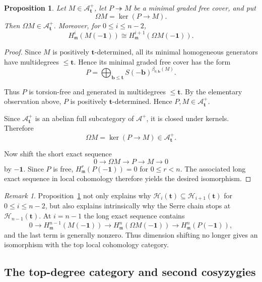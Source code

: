 \documentclass[12pt,reqno]{amsart}
\newtheorem{proposition}[theorem]{Proposition}
\theoremstyle{definition}
\theoremstyle{remark}
\newtheorem{remark}[theorem]{Remark}
\begin{document}
\begin{proposition}\label{prop:syzygy-filtration}
Let $M\in\mathcal A^+_{\mathbf t}$, let $P\twoheadrightarrow M$ be a minimal graded free cover, and put
$$
\Omega M=\ker(P\to M).
$$
Then $\Omega M\in\mathcal A^+_{\mathbf t}$. Moreover, for
$0\le i\le n-2$,
$$
H^i_{\mathfrak m}(M(-\mathbf1))
\cong
H^{i+1}_{\mathfrak m}(\Omega M(-\mathbf1)).
$$
\end{proposition}

\begin{proof}
Since $M$ is positively $\mathbf t$-determined, all its minimal homogeneous generators have multidegrees $\le \mathbf t$. Hence its minimal graded free cover has the form
$$
P=
\bigoplus_{\mathbf b\le \mathbf t}
S(-\mathbf b)^{\beta_{0,\mathbf b}(M)}.
$$

Thus $P$ is torsion-free and generated in multidegrees $\le \mathbf t$. By the elementary observation above, $P$ is positively $\mathbf t$-determined. Hence $P,M\in\mathcal A_{\mathbf t}^+.$


Since $\mathcal A_{\mathbf t}^+$ is an abelian full subcategory of $\mathcal A^+$, it is closed under kernels. Therefore
$$
\Omega M=\ker(P\to M)\in\mathcal A_{\mathbf t}^+.
$$

Now shift the short exact sequence
$$
0\longrightarrow\Omega M\longrightarrow P\longrightarrow M\longrightarrow0
$$
by $-\mathbf1$. Since $P$ is free, $H^r_{\mathfrak m}(P(-\mathbf1))=0$ for $0\leq r<n$.
The associated long exact sequence in local cohomology therefore yields the desired isomorphism.
\end{proof}




\begin{remark}\label{rem:dimension-shift-stops}
Proposition~\ref{prop:syzygy-filtration} not only explains why $\mathcal H_i(\mathbf t)\subseteq\mathcal H_{i+1}(\mathbf t)$ for $0\leq i\leq n-2$, but also explains intrinsically why the Serre chain stops at
$\mathcal H_{n-1}(\mathbf t)$.  At $i=n-1$ the long exact sequence contains
\[
0\longrightarrow H^{n-1}_{\mathfrak m}(M(-\mathbf1))
\longrightarrow H^n_{\mathfrak m}(\Omega M(-\mathbf1))
\longrightarrow H^n_{\mathfrak m}(P(-\mathbf1)),
\]
and the last term is generally nonzero.  Thus dimension shifting no longer
gives an isomorphism with the top local cohomology category.
\end{remark}

\subsection{The top-degree category and second cosyzygies}
\end{document}
